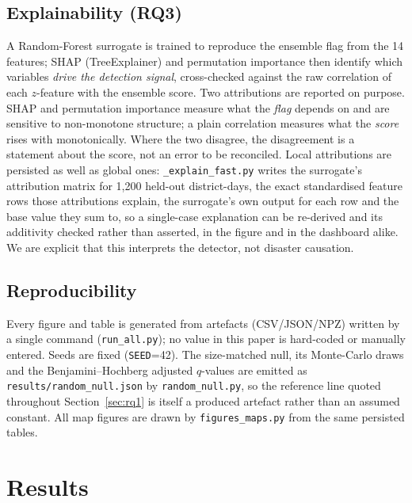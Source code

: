 \documentclass[preprint,12pt]{elsarticle}
\begin{document}
\subsection{Explainability (RQ3)}\label{sec:xai}
A Random-Forest surrogate is trained to reproduce the ensemble flag from the 14
features; SHAP \cite{lundberg2017,lundberg2020} (TreeExplainer) and permutation
importance then identify which
variables \emph{drive the detection signal}, cross-checked against the raw
correlation of each $z$-feature with the ensemble score. Two attributions are
reported on purpose. SHAP and permutation importance measure what the \emph{flag}
depends on and are sensitive to non-monotone structure; a plain correlation
measures what the \emph{score} rises with monotonically. Where the two disagree,
the disagreement is a statement about the score, not an error to be reconciled.
Local attributions are persisted as well as global ones:
\texttt{\_explain\_fast.py} writes the surrogate's attribution matrix for 1{,}200
held-out district-days, the exact standardised feature rows those attributions
explain, the surrogate's own output for each row and the base value they sum to,
so a single-case explanation can be re-derived and its additivity checked rather
than asserted, in the figure and in the dashboard alike.
We are explicit that this interprets the detector, not disaster causation.

\subsection{Reproducibility}
Every figure and table is generated from artefacts (CSV/JSON/NPZ) written by a
single command (\texttt{run\_all.py}); no value in this paper is hard-coded or
manually entered. Seeds are fixed (\texttt{SEED}=42). The size-matched null, its
Monte-Carlo draws and the Benjamini--Hochberg adjusted $q$-values are emitted as
\texttt{results/random\_null.json} by \texttt{random\_null.py}, so the reference
line quoted throughout Section~\ref{sec:rq1} is itself a produced artefact rather
than an assumed constant. All map figures are drawn by \texttt{figures\_maps.py}
from the same persisted tables.

\section{Results}\label{sec:results}
\end{document}
